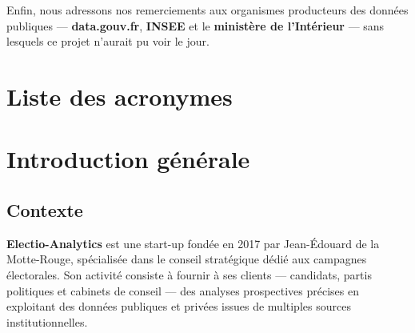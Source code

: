 \documentclass[12pt,a4paper,oneside]{report}
\begin{document}
Enfin, nous adressons nos remerciements aux organismes producteurs des données publiques — \textbf{data.gouv.fr}, \textbf{INSEE} et le \textbf{ministère de l'Intérieur} — sans lesquels ce projet n'aurait pu voir le jour.

\tableofcontents
\listoffigures
\listoftables

\chapter*{Liste des acronymes}
\begin{acronym}
\end{acronym}

\chapter*{Introduction générale}

\section*{Contexte}

\textbf{Electio-Analytics} est une start-up fondée en 2017 par Jean-Édouard de la Motte-Rouge, spécialisée dans le conseil stratégique dédié aux campagnes électorales. Son activité consiste à fournir à ses clients — candidats, partis politiques et cabinets de conseil — des analyses prospectives précises en exploitant des données publiques et privées issues de multiples sources institutionnelles.
\end{document}
